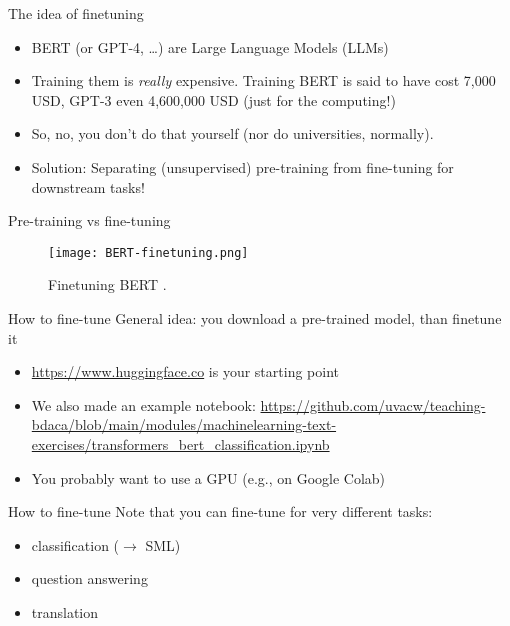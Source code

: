 \begin{frame}{The idea of finetuning}
  \begin{itemize}
  \item BERT (or GPT-4, \ldots) are Large Language Models (LLMs)
  \item Training them is \emph{really} expensive. Training BERT is said to have cost 7,000 USD, GPT-3 even 4,600,000 USD (just for the computing!) 
  \item So, no, you don't do that yourself (nor do universities, normally).
  \item Solution: Separating (unsupervised) pre-training from fine-tuning for downstream tasks!
  \end{itemize}

\end{frame}


\begin{frame}{Pre-training vs fine-tuning}
\begin{figure}
	\centering
	\texttt{[image: BERT-finetuning.png]}
	\caption{Finetuning BERT \parencite{Devlin2018}.}
	\label{fig:finetuning}
\end{figure}

\end{frame}


\begin{frame}{How to fine-tune}
General idea: you download a pre-trained model, than finetune it 
  
  \begin{itemize}
  \item \url{https://www.huggingface.co} is your starting point
  \item We also made an example notebook: \url{https://github.com/uvacw/teaching-bdaca/blob/main/modules/machinelearning-text-exercises/transformers_bert_classification.ipynb}
  \item You probably want to use a GPU (e.g., on Google Colab)
  \end{itemize}

\end{frame}


\begin{frame}{How to fine-tune}
Note that you can fine-tune for very different tasks:
  
  \begin{itemize}
  \item classification ($\rightarrow$ SML)
  \item question answering
  \item translation
  \end{itemize}
\end{frame}


